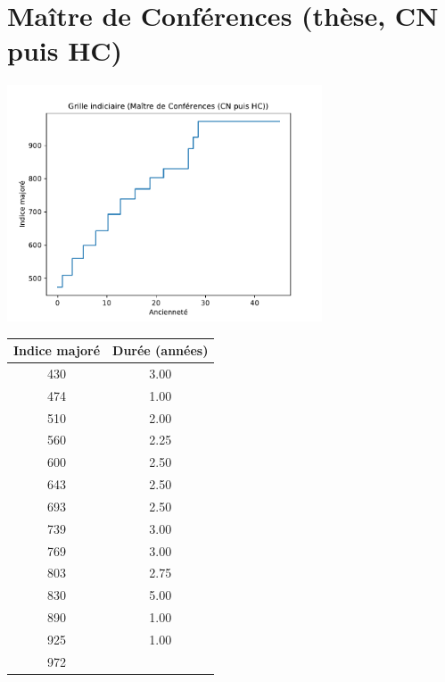 \newpage 
 
\chapter{Maître de Conférences (thèse, CN puis HC)} 

\begin{minipage}{0.55\linewidth}\includegraphics[width=0.7\textwidth]{fig/grille_MCF.pdf}\end{minipage} 
\begin{minipage}{0.3\linewidth} 
 \begin{center} 

\begin{tabular}[htb]{|c|c|} 
\hline 
 Indice majoré &  Durée (années) \\ 
\hline \hline 
 430 &  3.00 \\ 
\hline 
 474 &  1.00 \\ 
\hline 
 510 &  2.00 \\ 
\hline 
 560 &  2.25 \\ 
\hline 
 600 &  2.50 \\ 
\hline 
 643 &  2.50 \\ 
\hline 
 693 &  2.50 \\ 
\hline 
 739 &  3.00 \\ 
\hline 
 769 &  3.00 \\ 
\hline 
 803 &  2.75 \\ 
\hline 
 830 &  5.00 \\ 
\hline 
 890 &  1.00 \\ 
\hline 
 925 &  1.00 \\ 
\hline 
 972 &   \\ 
\hline 
\hline 
\end{tabular} 
\end{center} 
 \end{minipage} 


